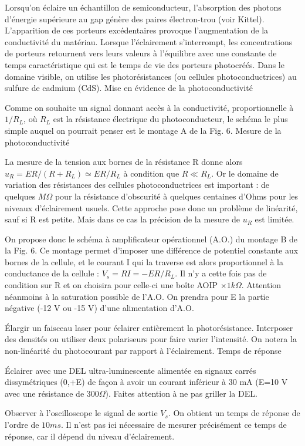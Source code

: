 \documentclass{article}%
\begin{document}
Lorsqu'on éclaire un échantillon de semiconducteur, l'absorption des photons d'énergie supérieure au gap génère des paires électron-trou (voir Kittel). L'apparition de ces porteurs excédentaires provoque l'augmentation de la conductivité du matériau. Lorsque l'éclairement s'interrompt, les concentrations de porteurs retournent vers leurs valeurs à l'équilibre avec une constante de temps caractéristique qui est le temps de vie des porteurs photocréés. Dans le domaine visible, on utilise les photorésistances (ou cellules photoconductrices) au sulfure de cadmium (CdS).
Mise en évidence de la photoconductivité

Comme on souhaite un signal donnant accès à la conductivité, proportionnelle à $1/R_L$, où $R_L$ est la résistance électrique du photoconducteur, le schéma le plus simple auquel on pourrait penser est le montage A de la Fig. 6.
Mesure de la photoconductivité

La mesure de la tension aux bornes de la résistance R donne alors $u_R=ER/(R+R_L) \simeq ER/R_L$ à condition que $R\ll R_L$. Or le domaine de variation des résistances des cellules photoconductrices est important : de quelques $M \Omega$ pour la résistance d'obscurité à quelques centaines d'Ohms pour les niveaux d'éclairement usuels. Cette approche pose donc un problème de linéarité, sauf si R est petite. Mais dans ce cas la précision de la mesure de $u_R$ est limitée.

On propose donc le schéma à amplificateur opérationnel (A.O.) du montage B de la Fig. 6. Ce montage permet d'imposer une différence de potentiel constante aux bornes de la cellule, et le courant I qui la traverse est alors proportionnel à la conductance de la cellule : $V_s=RI=-ER/R_L$. Il n'y a cette fois pas de condition sur R et on choisira pour celle-ci une boîte AOIP $\times 1 k\Omega$. Attention néanmoins à la saturation possible de l'A.O. On prendra pour E la partie négative (-12 V ou -15 V) d'une alimentation d'A.O.

Élargir un faisceau laser pour éclairer entièrement la photorésistance. Interposer des densités ou utiliser deux polariseurs pour faire varier l'intensité. On notera la non-linéarité du photocourant par rapport à l'éclairement.
Temps de réponse

Éclairer avec une DEL ultra-luminescente alimentée en signaux carrés dissymétriques (0,+E) de façon à avoir un courant inférieur à 30 mA (E=10 V avec une résistance de $300 \Omega$). Faites attention à ne pas griller la DEL.

Observer à l'oscilloscope le signal de sortie $V_{s}$. On obtient un temps de réponse de l'ordre de $10 ms$. Il n'est pas ici nécessaire de mesurer précisément ce temps de réponse, car il dépend du niveau d'éclairement.
\end{document}
